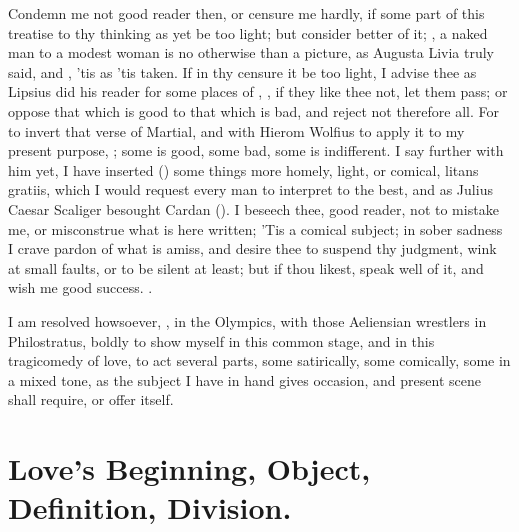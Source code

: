 {Condemn me not good reader then, or censure me hardly, if some part of
this treatise to thy thinking as yet be too light; but consider better
of it; , a naked man to a modest woman is no
otherwise than a picture, as Augusta Livia truly said, and , 'tis as 'tis taken. If in thy censure it be too
light, I advise thee as Lipsius did his reader for some places of
\Plautus{}, , if they like thee
not, let them pass; or oppose that which is good to that which is bad,
and reject not therefore all. For to invert that verse of Martial, and
with Hierom Wolfius to apply it to my present purpose, ; some is good, some bad, some is
indifferent. I say further with him yet, I have inserted
() some
things more homely, light, or comical, litans gratiis, \etc{} which I
would request every man to interpret to the best, and as Julius Caesar
Scaliger besought Cardan (). I beseech thee,
good reader, not to mistake me, or misconstrue what is here written;
 'Tis a comical subject; in sober sadness I crave
pardon of what is amiss, and desire thee to suspend thy judgment, wink
at small faults, or to be silent at least; but if thou likest, speak
well of it, and wish me good success. .

I am resolved howsoever, , in the
Olympics, with those Aeliensian wrestlers in Philostratus, boldly to
show myself in this common stage, and in this tragicomedy of love, to
act several parts, some satirically, some comically, some in a mixed
tone, as the subject I have in hand gives occasion, and present scene
shall require, or offer itself.

\section{Love's Beginning, Object, Definition, Division.}

}

